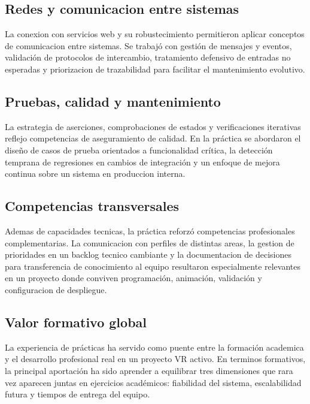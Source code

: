 \subsection{Redes y comunicacion entre sistemas}
La conexion con servicios web y su robustecimiento permitieron aplicar conceptos de comunicacion entre sistemas. Se trabajó con gestión de mensajes y eventos, validación de protocolos de intercambio, tratamiento defensivo de entradas no esperadas y priorizacion de trazabilidad para facilitar el mantenimiento evolutivo.\par

\subsection{Pruebas, calidad y mantenimiento}
La estrategia de aserciones, comprobaciones de estados y verificaciones iterativas reflejo competencias de aseguramiento de calidad. En la práctica se abordaron el diseño de casos de prueba orientados a funcionalidad crítica, la detección temprana de regresiones en cambios de integración y un enfoque de mejora continua sobre un sistema en produccion interna.\par

\subsection{Competencias transversales}
Ademas de capacidades tecnicas, la práctica reforzó competencias profesionales complementarias. La comunicacion con perfiles de distintas areas, la gestion de prioridades en un backlog tecnico cambiante y la documentacion de decisiones para transferencia de conocimiento al equipo resultaron especialmente relevantes en un proyecto donde conviven programación, animación, validación y configuracion de despliegue.\par

\subsection{Valor formativo global}
La experiencia de prácticas ha servido como puente entre la formación academica y el desarrollo profesional real en un proyecto VR activo. En terminos formativos, la principal aportación ha sido aprender a equilibrar tres dimensiones que rara vez aparecen juntas en ejercicios académicos: fiabilidad del sistema, escalabilidad futura y tiempos de entrega del equipo.\par
